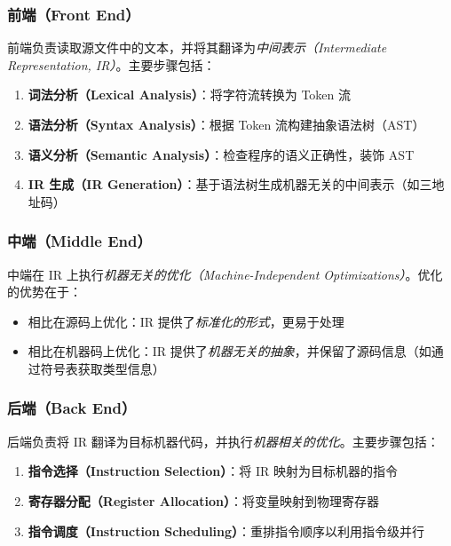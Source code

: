\documentclass[12pt,a4paper]{ctexart}
\begin{document}
\subsubsection{前端（Front End）}

前端负责读取源文件中的文本，并将其翻译为\emph{中间表示（Intermediate Representation, IR）}。主要步骤包括：

\begin{enumerate}[itemsep=0.3em]
  \item \textbf{词法分析（Lexical Analysis）}：将字符流转换为 Token 流
  \item \textbf{语法分析（Syntax Analysis）}：根据 Token 流构建抽象语法树（AST）
  \item \textbf{语义分析（Semantic Analysis）}：检查程序的语义正确性，装饰 AST
  \item \textbf{IR 生成（IR Generation）}：基于语法树生成机器无关的中间表示（如三地址码）
\end{enumerate}

\subsubsection{中端（Middle End）}

中端在 IR 上执行\emph{机器无关的优化（Machine-Independent Optimizations）}。优化的优势在于：

\begin{itemize}
  \item 相比在源码上优化：IR 提供了\emph{标准化的形式}，更易于处理
  \item 相比在机器码上优化：IR 提供了\emph{机器无关的抽象}，并保留了源码信息（如通过符号表获取类型信息）
\end{itemize}

\subsubsection{后端（Back End）}

后端负责将 IR 翻译为目标机器代码，并执行\emph{机器相关的优化}。主要步骤包括：

\begin{enumerate}[itemsep=0.3em]
  \item \textbf{指令选择（Instruction Selection）}：将 IR 映射为目标机器的指令
  \item \textbf{寄存器分配（Register Allocation）}：将变量映射到物理寄存器
  \item \textbf{指令调度（Instruction Scheduling）}：重排指令顺序以利用指令级并行
\end{enumerate}
\end{document}
